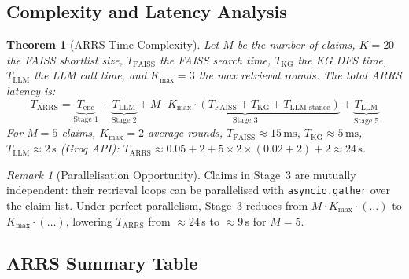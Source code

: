 \documentclass[12pt,a4paper]{article}
\theoremstyle{definition}
\theoremstyle{plain}
\newtheorem{theorem}{Theorem}[section]
\theoremstyle{remark}
\newtheorem{remark}{Remark}[section]
\begin{document}
\subsection{Complexity and Latency Analysis}
\label{sec:arrs_complexity}

\begin{theorem}[ARRS Time Complexity]
\label{thm:arrs_complexity}
Let $M$ be the number of claims, $K = 20$ the FAISS shortlist size, 
$T_{\text{FAISS}}$ the FAISS search time, $T_{\text{KG}}$ the KG DFS time, 
$T_{\text{LLM}}$ the LLM call time, and $K_{\max} = 3$ the max retrieval rounds. 
The total ARRS latency is:
\[
  T_{\text{ARRS}} = \underbrace{T_{\text{enc}}}_{\text{Stage 1}} + 
  \underbrace{T_{\text{LLM}}}_{\text{Stage 2}} + 
  \underbrace{M \cdot K_{\max} \cdot (T_{\text{FAISS}} + T_{\text{KG}} + T_{\text{LLM-stance}})}_{\text{Stage 3}} + 
  \underbrace{T_{\text{LLM}}}_{\text{Stage 5}}
\]
For $M = 5$ claims, $K_{\max} = 2$ average rounds, 
$T_{\text{FAISS}} \approx 15\,\text{ms}$, $T_{\text{KG}} \approx 5\,\text{ms}$, 
$T_{\text{LLM}} \approx 2\,\text{s}$ (Groq API): 
$T_{\text{ARRS}} \approx 0.05 + 2 + 5 \times 2 \times (0.02 + 2) + 2 \approx 24\,\text{s}$.
\end{theorem}

\begin{remark}[Parallelisation Opportunity]
Claims in Stage~3 are mutually independent: their retrieval loops can be 
parallelised with \texttt{asyncio.gather} over the claim list. Under perfect 
parallelism, Stage~3 reduces from $M \cdot K_{\max} \cdot (\ldots)$ to 
$K_{\max} \cdot (\ldots)$, lowering $T_{\text{ARRS}}$ from $\approx 24$\,s 
to $\approx 9$\,s for $M = 5$.
\end{remark}

\subsection{ARRS Summary Table}
\label{sec:arrs_summary_table}
\end{document}
